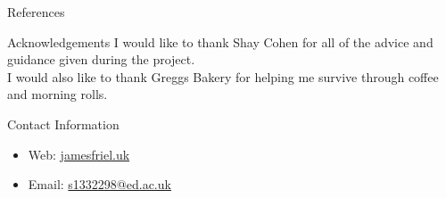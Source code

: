 \documentclass[final]{beamer}
\newlength{\onecolwid}
\begin{document}
\begin{frame}[t]
\begin{columns}[t]
\begin{column}{\onecolwid}
\begin{block}{References}
\small{
\vspace{0.75in}}

\end{block}



\begin{block}{Acknowledgements}
  I would like to thank Shay Cohen for all of the advice and guidance given during the project.\\
  I would also like to thank Greggs Bakery for  helping me survive through coffee and morning rolls.

\end{block}



\begin{alertblock}{Contact Information}

  \begin{itemize}
    \item Web: \href{http://jamesfriel.uk}{jamesfriel.uk}
    \item Email: \href{mailto:s1332298@ed.ac.uk}{s1332298@ed.ac.uk}
\end{itemize}

\end{alertblock}

\begin{center}
\begin{tabular}{ccc}
\end{tabular}
\end{center}


\end{column} %

\end{columns} %

\end{frame} %
\end{document}
